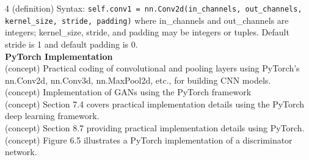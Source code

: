 \documentclass[8pt]{extarticle}
\begin{document}
\begin{multicols}{4}
(definition) Syntax: \texttt{self.conv1 = nn.Conv2d(in\_channels, out\_channels, kernel\_size, stride, padding)} where in\_channels and out\_channels are integers; kernel\_size, stride, and padding may be integers or tuples. Default stride is 1 and default padding is 0.\\
\vspace{2pt}\textbf{PyTorch Implementation}\\
(concept) Practical coding of convolutional and pooling layers using PyTorch's nn.Conv2d, nn.Conv3d, nn.MaxPool2d, etc., for building CNN models.\\
(concept) Implementation of GANs using the PyTorch framework\\
(concept) Section 7.4 covers practical implementation details using the PyTorch deep learning framework.\\
(concept) Section 8.7 providing practical implementation details using PyTorch.\\
(concept) Figure 6.5 illustrates a PyTorch implementation of a discriminator network.\\


\end{multicols}
\end{document}

